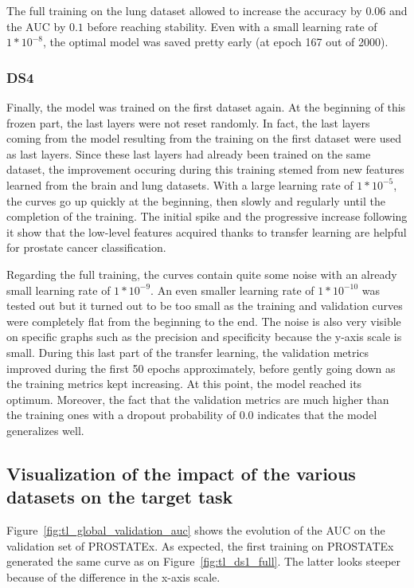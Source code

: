 The full training on the lung dataset allowed to increase the accuracy by $0.06$ and the AUC by $0.1$ before reaching stability. Even with a small learning rate of $1*10^{-8}$, the optimal model was saved pretty early (at epoch 167 out of 2000). 

\subsubsection{DS4}
\setlength{\marginparwidth}{3cm}\leavevmode {}Finally, the model was trained on the first dataset again. At the beginning of this frozen part, the last layers were not reset randomly. In fact, the last layers coming from the model resulting from the training on the first dataset were used as last layers. Since these last layers had already been trained on the same dataset, the improvement occuring during this training stemed from new features learned from the brain and lung datasets. With a large learning rate of $1*10^{-5}$, the curves go up quickly at the beginning, then slowly and regularly until the completion of the training. The initial spike and the progressive increase following it show that the low-level features acquired thanks to transfer learning are helpful for prostate cancer classification.

Regarding the full training, the curves contain quite some noise with an already small learning rate of $1*10^{-9}$. An even smaller learning rate of $1*10^{-10}$ was tested out but it turned out to be too small as the training and validation curves were completely flat from the beginning to the end. The noise is also very visible on specific graphs such as the precision and specificity because the y-axis scale is small. During this last part of the transfer learning, the validation metrics improved during the first 50 epochs approximately, before gently going down as the training metrics kept increasing. At this point, the model reached its optimum. Moreover, the fact that the validation metrics are much higher than the training ones with a dropout probability of 0.0 indicates that the model generalizes well. 


\subsection{Visualization of the impact of the various datasets on the target task}
\setlength{\marginparwidth}{3cm}\leavevmode {}\mbox{Figure \ref{fig:tl_global_validation_auc}} shows the evolution of the AUC on the validation set of PROSTATEx. As expected, the first training on PROSTATEx generated the same curve as on \mbox{Figure \ref{fig:tl_ds1_full}}. The latter looks steeper because of the difference in the x-axis scale.


